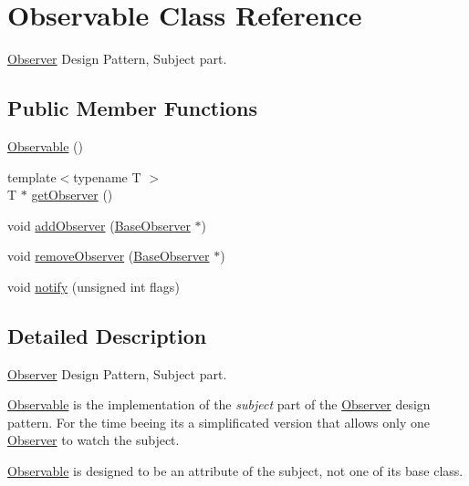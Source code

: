 \hypertarget{classKatabatic_1_1Observable}{}\section{Observable Class Reference}
\label{classKatabatic_1_1Observable}


\hyperlink{classKatabatic_1_1Observer}{Observer} Design Pattern, Subject part.  


\subsection*{Public Member Functions}
\begin{DoxyCompactItemize}
\item 
\hyperlink{classKatabatic_1_1Observable_a6438e92e07db169a97ed3eba36788dc4}{Observable} ()
\item 
{\footnotesize template$<$typename T $>$ }\\T $\ast$ \hyperlink{classKatabatic_1_1Observable_acc0b7276e09628f2b101ecf751aacd2a}{get\+Observer} ()
\item 
void \hyperlink{classKatabatic_1_1Observable_a783fda85eeabe9c660881f236f162767}{add\+Observer} (\hyperlink{classKatabatic_1_1BaseObserver}{Base\+Observer} $\ast$)
\item 
void \hyperlink{classKatabatic_1_1Observable_acaa5a7fc7fa631e3006a42006d753f43}{remove\+Observer} (\hyperlink{classKatabatic_1_1BaseObserver}{Base\+Observer} $\ast$)
\item 
void \hyperlink{classKatabatic_1_1Observable_a52e577fb0c4f2e3650928334fb621c2f}{notify} (unsigned int flags)
\end{DoxyCompactItemize}


\subsection{Detailed Description}
\hyperlink{classKatabatic_1_1Observer}{Observer} Design Pattern, Subject part. 

\hyperlink{classKatabatic_1_1Observable}{Observable} is the implementation of the {\itshape subject} part of the \hyperlink{classKatabatic_1_1Observer}{Observer} design pattern. For the time beeing it\textquotesingle{}s a simplificated version that allows only one \hyperlink{classKatabatic_1_1Observer}{Observer} to watch the subject.

\hyperlink{classKatabatic_1_1Observable}{Observable} is designed to be an attribute of the subject, not one of it\textquotesingle{}s base class.

